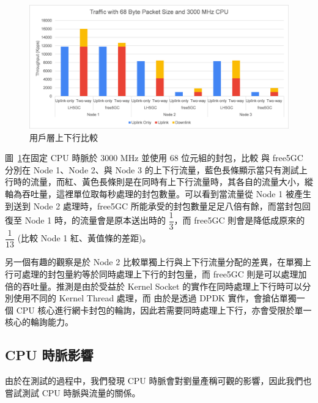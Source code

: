 \begin{figure}[htb]
    \centering
    \includegraphics[height=!,width=1\linewidth,keepaspectratio=true]{figures/up_uldl_comp}
    \caption[用戶層上下行比較]{{\footnotesize 用戶層上下行比較}}
    \label{fig:up_uldl_comp}
\end{figure}

圖~\ref{fig:up_uldl_comp}在固定 CPU 時脈於 3000 MHz 並使用 68 位元組的封包，比較 \LHCN 與 free5GC 分別在 Node 1、Node 2、與 Node 3 的上下行流量，藍色長條顯示當只有測試上行時的流量，而紅、黃色長條則是在同時有上下行流量時，其各自的流量大小，縱軸為吞吐量，這裡單位取每秒處理的封包數量。可以看到當流量從 Node 1 被產生到送到 Node 2 處理時，free5GC 所能承受的封包數量足足八倍有餘，而當封包回復至 Node 1 時，\LHCN 的流量會是原本送出時的 $\dfrac{1}{3}$，而 free5GC 則會是降低成原來的 $\dfrac{1}{13}$ (比較 Node 1 紅、黃值條的差距)。

另一個有趣的觀察是於 Node 2 比較單獨上行與上下行流量分配的差異，\LHCN 在單獨上行可處理的封包量約等於同時處理上下行的封包量，而 free5GC 則是可以處理加倍的吞吐量。推測是由於受益於 Kernel Socket 的實作在同時處理上下行時可以分別使用不同的 Kernel Thread 處理，而 \LHCN 由於是透過 DPDK 實作，會搶佔單獨一個 CPU 核心進行網卡封包的輪詢，因此若需要同時處理上下行，亦會受限於單一核心的輪詢能力。

\subsection{CPU 時脈影響}
\label{subsec:cpu_clock}

由於在測試的過程中，我們發現 CPU 時脈會對劉量產稱可觀的影響，因此我們也嘗試測試 CPU 時脈與流量的關係。

